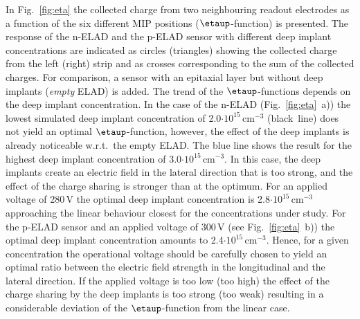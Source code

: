 \documentclass[a4paper,11pt]{article}
\begin{document}
In Fig.~\ref{fig:eta} the collected charge from two neighbouring readout electrodes as a function of the six different MIP positions ($\etaup$-function) is presented.
The response of the n-ELAD and the p-ELAD sensor with different deep implant concentrations are indicated as
 circles (triangles) showing the collected charge from the left (right) strip
 and as crosses corresponding to the sum of the collected charges. 
For comparison, a sensor with an epitaxial layer but without deep implants (\textit{empty} ELAD) is added. 
The trend of the $\etaup$-functions depends on the deep implant concentration.
In the case of the n-ELAD (Fig.~\ref{fig:eta}~a)) the lowest simulated deep implant concentration of 2.0$\mathrm{\cdot10^{15}\,cm^{-3}}$ (black~line) does not yield an optimal $\etaup$-function,
 however, the effect of the deep implants is already noticeable w.r.t.\ the empty ELAD. 
The blue line shows the result for the highest deep implant concentration of 3.0$\mathrm{\cdot10^{15}\,cm^{-3}}$. 
In this case, the deep implants create an electric field in the lateral direction that is too strong, and the effect of the charge sharing is stronger than at the optimum.
For an applied voltage of 280\,V the optimal deep implant concentration is 2.8$\mathrm{\cdot10^{15}\,cm^{-3}}$ approaching the linear behaviour closest for the concentrations under study.
For the p-ELAD sensor and an applied voltage of 300\,V (see Fig.~\ref{fig:eta}~b)) the optimal deep implant concentration amounts to 2.4$\mathrm{\cdot10^{15}\,cm^{-3}}$.
Hence, for a given concentration the operational voltage should be carefully chosen to yield an optimal ratio between the electric field strength in the longitudinal and the lateral direction. 
If the applied voltage is too low (too high) the effect of the charge sharing by the deep implants is too strong (too weak) resulting in a considerable deviation of the $\etaup$-function from the linear case.
\end{document}
